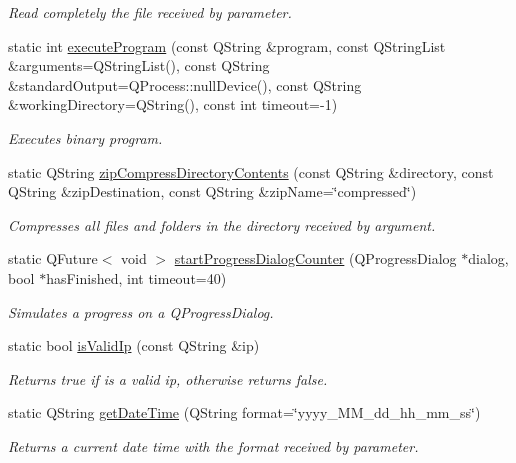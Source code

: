 \begin{DoxyCompactItemize}
\begin{DoxyCompactList}\small\item\em Read completely the file received by parameter. \end{DoxyCompactList}\item 
static int \mbox{\hyperlink{classUtils_a0ba873605d1b72ee448c18507d898d21}{execute\+Program}} (const Q\+String \&program, const Q\+String\+List \&arguments=Q\+String\+List(), const Q\+String \&standard\+Output=Q\+Process\+::null\+Device(), const Q\+String \&working\+Directory=Q\+String(), const int timeout=-\/1)
\begin{DoxyCompactList}\small\item\em Executes binary program. \end{DoxyCompactList}\item 
static Q\+String \mbox{\hyperlink{classUtils_ad33c4bda97a81483e4b34e692e747d0b}{zip\+Compress\+Directory\+Contents}} (const Q\+String \&directory, const Q\+String \&zip\+Destination, const Q\+String \&zip\+Name=\char`\"{}compressed\char`\"{})
\begin{DoxyCompactList}\small\item\em Compresses all files and folders in the directory received by argument. \end{DoxyCompactList}\item 
static Q\+Future$<$ void $>$ \mbox{\hyperlink{classUtils_a12f3c653e90f7ed38287f0a8897f60d5}{start\+Progress\+Dialog\+Counter}} (Q\+Progress\+Dialog $\ast$dialog, bool $\ast$has\+Finished, int timeout=40)
\begin{DoxyCompactList}\small\item\em Simulates a progress on a Q\+Progress\+Dialog. \end{DoxyCompactList}\item 
static bool \mbox{\hyperlink{classUtils_a1909e9cbf006b2ea0681d7c32605aca6}{is\+Valid\+Ip}} (const Q\+String \&ip)
\begin{DoxyCompactList}\small\item\em Returns true if is a valid ip, otherwise returns false. \end{DoxyCompactList}\item 
static Q\+String \mbox{\hyperlink{classUtils_aedd4143ac5a4b343d1486b9629a2d185}{get\+Date\+Time}} (Q\+String format=\char`\"{}yyyy\+\_\+\+M\+M\+\_\+dd\+\_\+hh\+\_\+mm\+\_\+ss\char`\"{})
\begin{DoxyCompactList}\small\item\em Returns a current date time with the format received by parameter. \end{DoxyCompactList}\item 

\end{DoxyCompactItemize}
